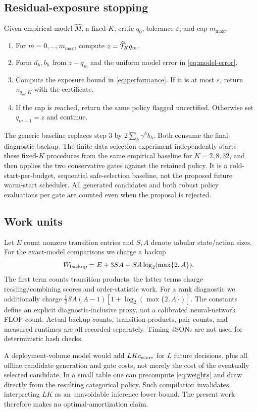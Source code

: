 \documentclass[11pt]{article}
\begin{document}
\subsection{Residual-exposure stopping}
Given empirical model $\widehat M$, a fixed $K$, critic $q_0$, tolerance $\varepsilon$, and cap $m_{\max}$:
\begin{enumerate}
\item For $m=0,\ldots,m_{\max}$, compute $z=\widehat{\mathcal T}_Kq_m$.
\item Form $d_h,b_h$ from $z-q_m$ and the uniform model error in \eqref{eq:model-error}.
\item Compute the exposure bound in \eqref{eq:performance}. If it is at most $\varepsilon$, return $\pi_{q_m,K}$ with the certificate.
\item If the cap is reached, return the same policy flagged uncertified. Otherwise set $q_{m+1}=z$ and continue.
\end{enumerate}
The generic baseline replaces step 3 by $2\sum_h\gamma^hb_h$. Both consume the final diagnostic backup. The finite-data selection experiment independently starts these fixed-$K$ procedures from the same empirical baseline for $K=2,8,32$, and then applies the two conservative gates against the retained policy. It is a cold-start-per-budget, sequential safe-selection baseline, not the proposed future warm-start scheduler. All generated candidates and both robust policy evaluations per gate are counted even when the proposal is rejected.

\subsection{Work units}
Let $E$ count nonzero transition entries and $S,A$ denote tabular state/action sizes. For the exact-model comparisons we charge a backup
\[
 W_{\rm backup}=E+3SA+SA\log_2(\max\{2,A\}).
\]
The first term counts transition products; the latter terms charge reading/combining scores and order-statistic work. For a rank diagnostic we additionally charge
$\tfrac12SA(A-1)[1+\log_2(\max\{2,A\})]$.
The constants define an explicit diagnostic-inclusive proxy, not a calibrated neural-network FLOP count. Actual backup counts, transition products, pair counts, and measured runtimes are all recorded separately. Timing JSONs are not used for deterministic hash checks.

A deployment-volume model would add $LKc_{\rm score}$ for $L$ future decisions, plus all offline candidate generation and gate costs, not merely the cost of the eventually selected candidate. In a small table one can precompute \eqref{eq:weights} and draw directly from the resulting categorical policy. Such compilation invalidates interpreting $LK$ as an unavoidable inference lower bound. The present work therefore makes no optimal-amortization claim.
\end{document}
